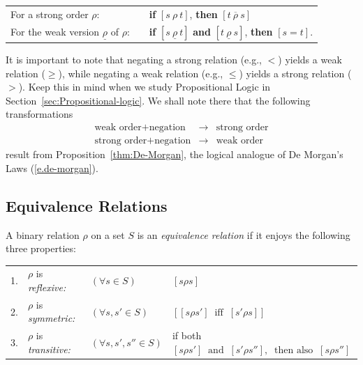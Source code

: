 \smallskip

\begin{tabular}{lll}
For a strong order $\rho$: & &
{\bf if} $[s \ \rho \ t]$, {\bf then} $[t \ \overline{\rho} \ s]$ \\
For the weak version $\underline{\rho}$ of $\rho$: & &
{\bf if} $[s \ \underline{\rho} \ t]$ {\bf and} $[t \ \underline{\rho}
  \ s]$, {\bf then} $[s = t]$.
\end{tabular}

\medskip

It is important to note that negating a strong relation (e.g., $<$) yields a weak relation ($\geq$), while negating a weak relation (e.g., $\leq$) yields a strong relation ($>$).  Keep this in mind when we study Propositional Logic in Section~\ref{sec:Propositional-logic}.  We shall note there that the following transformations
\begin{eqnarray*}
\mbox{weak order} + \mbox{negation} 
 & \longrightarrow & \mbox{strong order} \\
\mbox{strong order} + \mbox{negation}
 & \longrightarrow & \mbox{weak order}
\end{eqnarray*}
result from Proposition~\ref{thm:De-Morgan}, the logical analogue of De Morgan's Laws (\ref{e.de-morgan}).

\subsection{Equivalence Relations}
\label{sec:equiv-relation}

  

A binary relation $\rho$ on a set $S$ is an {\it equivalence relation} if it enjoys the following three properties:

\medskip

\begin{tabular}{llll}
1. &
$\rho$ is {\em reflexive:}
   & $(\forall s \in S)$ & $[s \rho s]$ \\
2. &
$\rho$ is {\em symmetric:}
   & $(\forall s, s' \in S)$ 
& $\left[ [s \rho s'] \ \mbox{ iff } \ [s' \rho s] \right]$ \\
3. &
$\rho$ is {\em transitive:}
   & $(\forall s, s', s'' \in S)$ & if both \
$[s \rho s'] \ \mbox{ and } \ [s' \rho s''], \ \mbox{ then also } \ [s \rho s'']$
\end{tabular}

\medskip

